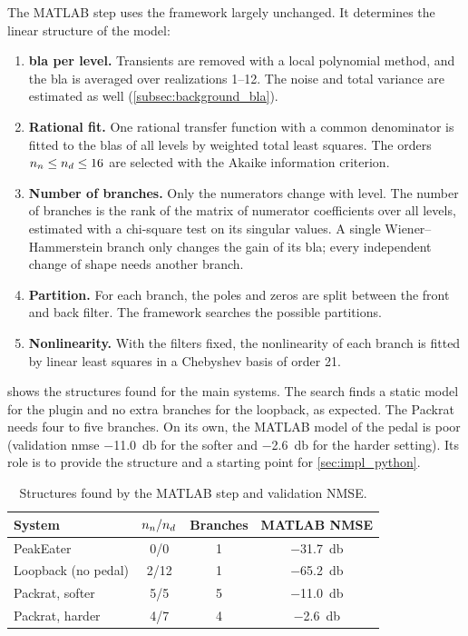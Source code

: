 The MATLAB step uses the framework largely unchanged. It determines the linear structure of the model:
\begin{enumerate}
  \item \textbf{\gls{bla} per level.} Transients are removed with a local polynomial method, and the \gls{bla} is averaged over realizations 1--12. The noise and total variance are estimated as well (\cref{subsec:background_bla}).
  \item \textbf{Rational fit.} One rational transfer function with a common denominator is fitted to the \glspl{bla} of all levels by weighted total least squares. The orders $n\sb{n} \leq n\sb{d} \leq 16$ are selected with the Akaike information criterion.
  \item \textbf{Number of branches.} Only the numerators change with level. The number of branches is the rank of the matrix of numerator coefficients over all levels, estimated with a chi-square test on its singular values. A single Wiener--Hammerstein branch only changes the gain of its \gls{bla}; every independent change of shape needs another branch.
  \item \textbf{Partition.} For each branch, the poles and zeros are split between the front and back filter. The framework searches the possible partitions.
  \item \textbf{Nonlinearity.} With the filters fixed, the nonlinearity of each branch is fitted by linear least squares in a Chebyshev basis of order 21.
\end{enumerate}

 shows the structures found for the main systems. The search finds a static model for the plugin and no extra branches for the loopback, as expected. The Packrat needs four to five branches. On its own, the MATLAB model of the pedal is poor (validation \gls{nmse} \SI{-11.0}{\decibel} for the softer and \SI{-2.6}{\decibel} for the harder setting). Its role is to provide the structure and a starting point for \cref{sec:impl_python}.

\begin{table}[htbp]
  \centering
  \caption{Structures found by the MATLAB step and validation NMSE.}
  \label{tab:impl_structures}
  \begin{tabular}{lccc}
    \toprule
    System & $n\sb{n} / n\sb{d}$ & Branches & MATLAB NMSE \\
    \midrule
    PeakEater & 0/0 & 1 & \SI{-31.7}{\decibel} \\
    Loopback (no pedal) & 2/12 & 1 & \SI{-65.2}{\decibel} \\
    Packrat, softer & 5/5 & 5 & \SI{-11.0}{\decibel} \\
    Packrat, harder & 4/7 & 4 & \SI{-2.6}{\decibel} \\
    \bottomrule
  \end{tabular}
\end{table}


